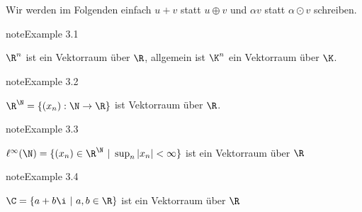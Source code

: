 \documentclass[letterpaper,10pt,english]{jupyterBook}
\begin{document}
Wir werden im Folgenden einfach \(u +v\) statt \(u \oplus v\) und \(\alpha v\) statt \(\alpha \odot v\) schreiben.
\label{vektorraeume/vektorraeume:example-1}
\begin{sphinxadmonition}{note}{Example 3.1}



\(\R^n\) ist ein Vektorraum über \(\R\), allgemein ist \(\K^n\) ein Vektorraum über \(\K\).
\end{sphinxadmonition}
\label{vektorraeume/vektorraeume:example-2}
\begin{sphinxadmonition}{note}{Example 3.2}



\(\R^\N =  \{(x_n):\N \rightarrow \R\}\) ist Vektorraum über \(\R\).
\end{sphinxadmonition}
\label{vektorraeume/vektorraeume:example-3}
\begin{sphinxadmonition}{note}{Example 3.3}



\(\ell^\infty(\N) = \{(x_n) \in \R^\N~|~\sup_n |x_n| < \infty\}\) ist ein Vektorraum über \(\R\)
\end{sphinxadmonition}
\label{vektorraeume/vektorraeume:example-4}
\begin{sphinxadmonition}{note}{Example 3.4}



\(\C = \{ a + b \i ~|~ a,b \in \R\}\) ist ein Vektorraum über \(\R\)
\end{sphinxadmonition}
\end{document}
